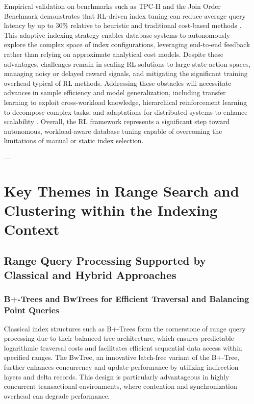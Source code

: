 \documentclass[11pt]{article}
\begin{document}
Empirical validation on benchmarks such as TPC-H and the Join Order Benchmark demonstrates that RL-driven index tuning can reduce average query latency by up to 30\% relative to heuristic and traditional cost-based methods \cite{ref33}. This adaptive indexing strategy enables database systems to autonomously explore the complex space of index configurations, leveraging end-to-end feedback rather than relying on approximate analytical cost models. Despite these advantages, challenges remain in scaling RL solutions to large state-action spaces, managing noisy or delayed reward signals, and mitigating the significant training overhead typical of RL methods. Addressing these obstacles will necessitate advances in sample efficiency and model generalization, including transfer learning to exploit cross-workload knowledge, hierarchical reinforcement learning to decompose complex tasks, and adaptations for distributed systems to enhance scalability \cite{ref33}. Overall, the RL framework represents a significant step toward autonomous, workload-aware database tuning capable of overcoming the limitations of manual or static index selection.


---

\section{Key Themes in Range Search and Clustering within the Indexing Context}

\subsection{Range Query Processing Supported by Classical and Hybrid Approaches}

\subsubsection{B+-Trees and BwTrees for Efficient Traversal and Balancing Point Queries}

Classical index structures such as B+-Trees form the cornerstone of range query processing due to their balanced tree architecture, which ensures predictable logarithmic traversal costs and facilitates efficient sequential data access within specified ranges. The BwTree, an innovative latch-free variant of the B+-Tree, further enhances concurrency and update performance by utilizing indirection layers and delta records. This design is particularly advantageous in highly concurrent transactional environments, where contention and synchronization overhead can degrade performance.
\end{document}
